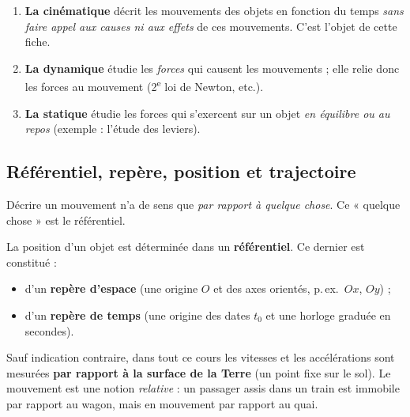 \documentclass[11pt,a4paper]{article}
\newcommand{\vv}[1]{\vec{#1}}
\begin{document}
\begin{enumerate}[leftmargin=1.8em]
  \item \textbf{La cinématique} décrit les mouvements des objets en fonction du temps
        \emph{sans faire appel aux causes ni aux effets} de ces mouvements. C'est l'objet de cette fiche.
  \item \textbf{La dynamique} étudie les \emph{forces} qui causent les mouvements ; elle relie donc les forces au mouvement (2\textsuperscript{e} loi de Newton, etc.).
  \item \textbf{La statique} étudie les forces qui s'exercent sur un objet \emph{en équilibre ou au repos} (exemple : l'étude des leviers).
\end{enumerate}

\subsection{Référentiel, repère, position et trajectoire}

Décrire un mouvement n'a de sens que \emph{par rapport à quelque chose}. Ce « quelque chose » est le référentiel.

\begin{definition}[référentiel]
La position d'un objet est déterminée dans un \textbf{référentiel}. Ce dernier est constitué :
\begin{itemize}[leftmargin=1.6em,topsep=2pt,itemsep=1pt]
  \item d'un \textbf{repère d'espace} (une origine $O$ et des axes orientés, p.\,ex.\ $Ox$, $Oy$) ;
  \item d'un \textbf{repère de temps} (une origine des dates $t_0$ et une horloge graduée en secondes).
\end{itemize}
\end{definition}

\begin{remarque}
Sauf indication contraire, dans tout ce cours les vitesses et les accélérations sont
mesurées \textbf{par rapport à la surface de la Terre} (un point fixe sur le sol).
Le mouvement est une notion \emph{relative} : un passager assis dans un train est immobile
par rapport au wagon, mais en mouvement par rapport au quai.
\end{remarque}

\begin{center}
\end{center}
\end{document}
